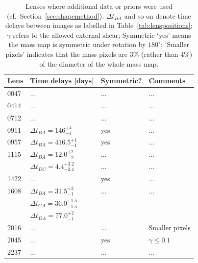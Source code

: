 \documentclass[useAMS,usenatbib]{mn2e}
\begin{document}
\begin{table}
\begin{center}
    \label{tab:lensproperties}
  \end{center}
\end{table}

\setlength\tabcolsep{5pt}
\begin{table}
  \begin{center} \begin{tabular}{l l l l}
      Lens & Time delays [days] & Symmetric? & Comments \\ \hline
      0047 & ... & ... & ... \\
      0414 & ... & ... & ... \\
      0712 & ... & ... & ... \\
      0911 & $\Delta t_{BA}=146^{+4}_{-4}$ & yes & ... \\
      0957 & $\Delta t_{BA}=416.5^{+1}_{-1}$ & yes & ... \\
      1115 & $\Delta t_{BA}=12.0^{+2}_{-2}$ & ... & ... \\
           & $\Delta t_{DC}=4.4^{+3.2}_{-2.4}$ & ... & ... \\
      1422 & ... & yes & ... \\
      1608 & $\Delta t_{BA}=31.5^{+2}_{-1}$ & ... & ... \\
           & $\Delta t_{CA}=36.0^{+1.5}_{-1.5}$ & \\
           & $\Delta t_{DA}=77.0^{+2}_{-1}$ & \\
      2016 & ... & ... & Smaller pixels \\
      2045 & ... & yes & $\gamma\leq 0.1$ \\
      2237 & ... & ... & ... \\
    \end{tabular}
    \caption[width=\linewidth]{Lenses where additional data or priors were used (cf.~Section~\ref{sec:shapemethod}). $\Delta t_{BA}$ and so on denote time delays between images as labelled in Table~\ref{tab:lenspositions}; $\gamma$ refers to the allowed external shear; Symmetric `yes' means the mass map is symmetric under rotation by $180^\circ$; `Smaller pixels' indicates that the mass pixels are 3\% (rather than 4\%) of the diameter of the whole mass map.}
    \label{tab:lenspriors}
  \end{center}
\end{table}
\setlength\tabcolsep{6pt}
\end{document}
